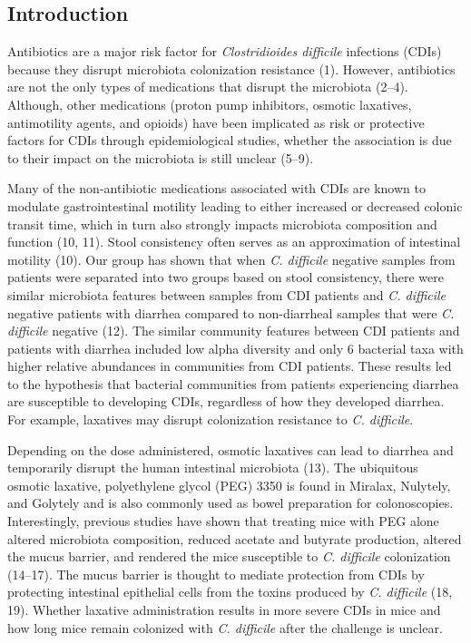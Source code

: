 \documentclass[
  11pt,
]{article}
\begin{document}
\newpage

\hypertarget{introduction}{%
\subsection{Introduction}\label{introduction}}

Antibiotics are a major risk factor for \emph{Clostridioides difficile}
infections (CDIs) because they disrupt microbiota colonization
resistance (1). However, antibiotics are not the only types of
medications that disrupt the microbiota (2--4). Although, other
medications (proton pump inhibitors, osmotic laxatives, antimotility
agents, and opioids) have been implicated as risk or protective factors
for CDIs through epidemiological studies, whether the association is due
to their impact on the microbiota is still unclear (5--9).

Many of the non-antibiotic medications associated with CDIs are known to
modulate gastrointestinal motility leading to either increased or
decreased colonic transit time, which in turn also strongly impacts
microbiota composition and function (10, 11). Stool consistency often
serves as an approximation of intestinal motility (10). Our group has
shown that when \emph{C. difficile} negative samples from patients were
separated into two groups based on stool consistency, there were similar
microbiota features between samples from CDI patients and \emph{C.
difficile} negative patients with diarrhea compared to non-diarrheal
samples that were \emph{C. difficile} negative (12). The similar
community features between CDI patients and patients with diarrhea
included low alpha diversity and only 6 bacterial taxa with higher
relative abundances in communities from CDI patients. These results led
to the hypothesis that bacterial communities from patients experiencing
diarrhea are susceptible to developing CDIs, regardless of how they
developed diarrhea. For example, laxatives may disrupt colonization
resistance to \emph{C. difficile}.

Depending on the dose administered, osmotic laxatives can lead to
diarrhea and temporarily disrupt the human intestinal microbiota (13).
The ubiquitous osmotic laxative, polyethylene glycol (PEG) 3350 is found
in Miralax, Nulytely, and Golytely and is also commonly used as bowel
preparation for colonoscopies. Interestingly, previous studies have
shown that treating mice with PEG alone altered microbiota composition,
reduced acetate and butyrate production, altered the mucus barrier, and
rendered the mice susceptible to \emph{C. difficile} colonization
(14--17). The mucus barrier is thought to mediate protection from CDIs
by protecting intestinal epithelial cells from the toxins produced by
\emph{C. difficile} (18, 19). Whether laxative administration results in
more severe CDIs in mice and how long mice remain colonized with
\emph{C. difficile} after the challenge is unclear.
\end{document}
